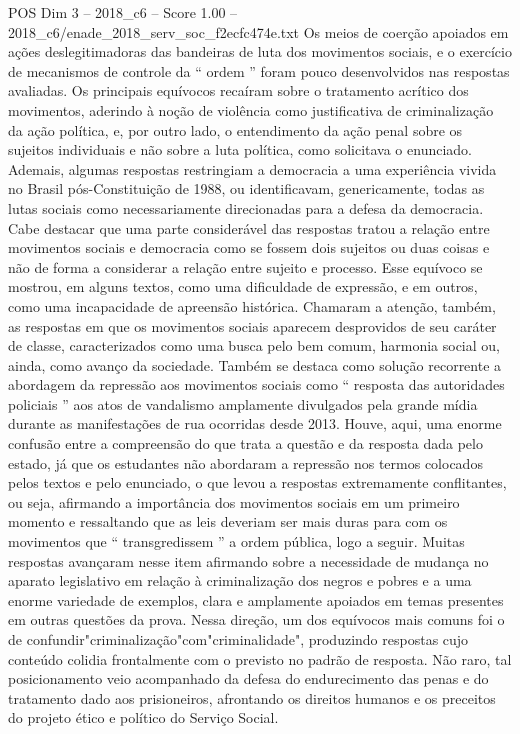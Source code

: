 \begin{textsample}{POS Dim 3 – 2018\_c6 – Score 1.00 – 2018\_c6/enade\_2018\_serv\_soc\_f2ecfc474e.txt}
Os meios de coerção apoiados em ações deslegitimadoras das bandeiras de luta dos movimentos sociais, e o exercício de mecanismos de controle da “ ordem ” foram pouco desenvolvidos nas respostas avaliadas.
Os principais equívocos recaíram sobre o tratamento acrítico dos movimentos, aderindo à noção de violência como justificativa de criminalização da ação política, e, por outro lado, o entendimento da ação penal sobre os sujeitos individuais e não sobre a luta política, como solicitava o enunciado.
Ademais, algumas respostas restringiam a democracia a uma experiência vivida no Brasil pós-Constituição de 1988, ou identificavam, genericamente, todas as lutas sociais como necessariamente direcionadas para a defesa da democracia.
Cabe destacar que uma parte considerável das respostas tratou a relação entre movimentos sociais e democracia como se fossem dois sujeitos ou duas coisas e não de forma a considerar a relação entre sujeito e processo.
Esse equívoco se mostrou, em alguns textos, como uma dificuldade de expressão, e em outros, como uma incapacidade de apreensão histórica.
Chamaram a atenção, também, as respostas em que os movimentos sociais aparecem desprovidos de seu caráter de classe, caracterizados como uma busca pelo bem comum, harmonia social ou, ainda, como avanço da sociedade.
Também se destaca como solução recorrente a abordagem da repressão aos movimentos sociais como “ resposta das autoridades policiais ” aos atos de vandalismo amplamente divulgados pela grande mídia durante as manifestações de rua ocorridas desde 2013.
Houve, aqui, uma enorme confusão entre a compreensão do que trata a questão e da resposta dada pelo estado, já que os estudantes não abordaram a repressão nos termos colocados pelos textos e pelo enunciado, o que levou a respostas extremamente conflitantes, ou seja, afirmando a importância dos movimentos sociais em um primeiro momento e ressaltando que as leis deveriam ser mais duras para com os movimentos que “ transgredissem ” a ordem pública, logo a seguir.
Muitas respostas avançaram nesse item afirmando sobre a necessidade de mudança no aparato legislativo em relação à criminalização dos negros e pobres e a uma enorme variedade de exemplos, clara e amplamente apoiados em temas presentes em outras questões da prova.
Nessa direção, um dos equívocos mais comuns foi o de confundir"criminalização"com"criminalidade", produzindo respostas cujo conteúdo colidia frontalmente com o previsto no padrão de resposta.
Não raro, tal posicionamento veio acompanhado da defesa do endurecimento das penas e do tratamento dado aos prisioneiros, afrontando os direitos humanos e os preceitos do projeto ético e político do Serviço Social.

\end{textsample}
